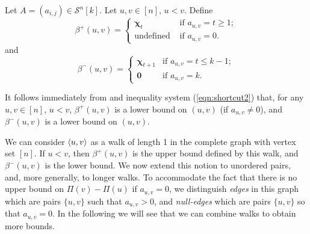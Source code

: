 \documentclass[runningheads]{llncs}
\begin{document}
\begin{definition}\label{def:bounds}
Let $A=(a_{i,j})\in\mathcal{S}^n[k]$. 
Let $u,v\in [n]$, $u<v$. Define
$$
 \beta^+(u,v)= \left\{\begin{array}{ll}
    \bm\chi_{t} & \text{if }a_{u,v}=t\geq 1; \\  
    \text{undefined } &\text{if } a_{u,v}=0.
\end{array}\right.
$$
and
$$\beta^-(u,v) = 
\left\{\begin{array}{ll}%
    \bm\chi_{t+1} & \text{if }a_{u,v}=t\leq k-1; \\  %
    \bm0 &\text{if } a_{u,v}=k.
\end{array}\right.
$$
\end{definition}

It follows immediately from  and inequality system (\ref{eqn:shortcut2}) that, for any $u,v\in [n]$, $u<v$, $\beta^+(u,v)$ is a lower bound on $(u,v)$ (if $a_{u,v}\not=0$), and $\beta^-(u,v)$ is a lower bound on $(u,v)$.




We can consider $\langle u,v\rangle$ as a walk of length 1 in the complete graph 
with vertex set $[n]$. If $u<v$, then $\beta^+(u,v)$ is the upper bound defined by this walk, and $\beta^-(u,v)$ is the lower bound. We now extend this notion to unordered pairs, and, more generally, to longer walks. To accommodate the fact that there is no upper bound on $\Pi(v)-\Pi(u)$ if $a_{u,v}=0$, we distinguish \emph{edges} in this graph which are pairs $\{u,v\}$ such that $a_{u,v}>0$, and \emph{null-edges} which are pairs $\{ u,v\}$ so that $a_{u,v}=0$. In the following we will see that we can combine walks to obtain more bounds. 
\end{document}
